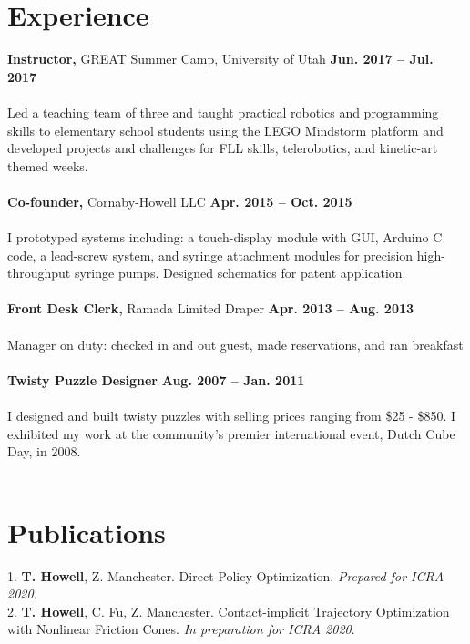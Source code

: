 \documentclass[margin,line]{res}
\begin{document}
\begin{resume}
\section{\sc Experience}
{\bf Instructor,} GREAT Summer Camp, University of Utah
\hfill {\bf Jun. 2017 – Jul. 2017}\\
\\
Led a teaching team of three and taught practical robotics and programming skills to elementary school students using the LEGO Mindstorm platform and developed projects and challenges for FLL skills, telerobotics, and kinetic-art themed weeks.\\
\\
{\bf Co-founder,} Cornaby-Howell LLC
\hfill {\bf Apr. 2015 – Oct. 2015}\\
\\
I prototyped systems including: a touch-display module with GUI, Arduino C code, a lead-screw system,
and syringe attachment modules for precision high-throughput syringe pumps. Designed schematics for patent application.\\
\\
{\bf Front Desk Clerk,} Ramada Limited Draper
\hfill {\bf Apr. 2013 – Aug. 2013}\\
\\
Manager on duty: checked in and out guest, made reservations, and ran breakfast\\
\\
{\bf Twisty Puzzle Designer} 
\hfill {\bf Aug. 2007 – Jan. 2011}\\
\\
I designed and built twisty puzzles with selling prices ranging from \$25 - \$850. I exhibited my work at
the community’s premier international event, Dutch Cube Day, in 2008.\\
\\


\section{\sc Publications}
1. \textbf{T. Howell}, Z. Manchester. Direct Policy Optimization. \textit{Prepared for ICRA 2020}.\\

2. \textbf{T. Howell}, C. Fu, Z. Manchester. Contact-implicit Trajectory Optimization with Nonlinear Friction Cones. \textit{In preparation for ICRA 2020}.\\


\end{resume}
\end{document}
